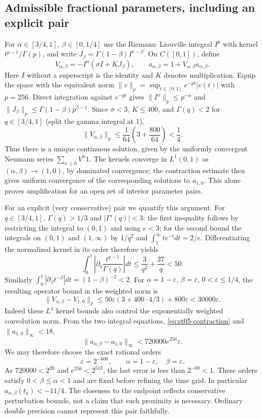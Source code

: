 \documentclass[11pt,a4paper]{amsart}
\theoremstyle{remark}
\theoremstyle{plain}
\theoremstyle{remark}
\numberwithin{equation}{section}
\begin{document}
\subsection{Admissible fractional parameters, including an explicit pair}
For $\alpha\in[3/4,1]$, $\beta\in[0,1/4]$ use the Riemann--Liouville integral $I^p$ with kernel $t^{p-1}/\Gamma(p)$, and write $J_\beta=\Gamma(1-\beta)I^{1-\beta}$. On $C([0,1])$, define
\[
 V_{\alpha,\beta}=-I^\alpha(\sigma I+K J_\beta),\qquad
 a_{\alpha,\beta}=1+V_{\alpha,\beta}a_{\alpha,\beta}.
\]
Here $I$ without a superscript is the identity and $K$ denotes multiplication. Equip the space with the equivalent norm $\|v\|_p=\sup_{t\in[0,1]}e^{-pt}|v(t)|$ with $p=256$. Direct integration against $e^{-pt}$ gives $\|I^\alpha\|_p\le p^{-\alpha}$ and $\|J_\beta\|_p\le\Gamma(1-\beta)p^{\beta-1}$. Since $\sigma<3$, $K\le400$, and $\Gamma(q)<2$ for $q\in[3/4,1]$ (split the gamma integral at 1),
\begin{equation}\label{eq:st05-contraction}
 \|V_{\alpha,\beta}\|_p\le\frac1{64}\left(3+\frac{800}{64}\right)<\frac14.
\end{equation}
Thus there is a unique continuous solution, given by the uniformly convergent Neumann series $\sum_{n\ge0}V^n1$. The kernels converge in $L^1(0,1)$ as $(\alpha,\beta)\to(1,0)$, by dominated convergence; the contraction estimate then gives uniform convergence of the corresponding solutions to $a_{1,0}$. This alone proves amplification for an open set of interior parameter pairs.

For an explicit (very conservative) pair we quantify this argument. For $q\in[3/4,1]$, $\Gamma(q)>1/3$ and $|\Gamma'(q)|<3$: the first inequality follows by restricting the integral to $(0,1)$ and using $e<3$; for the second bound the integrals on $(0,1)$ and $(1,\infty)$ by $1/q^2$ and $\int_1^\infty t e^{-t}dt=2/e$. Differentiating the normalized kernel in its order therefore yields
\[
 \int_0^1\left|\partial_q\frac{t^{q-1}}{\Gamma(q)}\right|dt
 \le \frac{3}{q^2}+\frac{27}{q}<50.
\]
Similarly $\int_0^1|\partial_\beta t^{-\beta}|dt=(1-\beta)^{-2}<2$. For $\alpha=1-\varepsilon$, $\beta=\varepsilon$, $0<\varepsilon\le1/4$, the resulting operator bound in the weighted norm is
\[
 \|V_{\alpha,\beta}-V_{1,0}\|_p
 \le 50\varepsilon(3+400\cdot4/3)+800\varepsilon<30000\varepsilon.
\]
Indeed these $L^1$ kernel bounds also control the exponentially weighted convolution norm. From the two integral equations, \eqref{eq:st05-contraction} and $\|a_{1,0}\|_\infty<18$,
\[
 \|a_{\alpha,\beta}-a_{1,0}\|_\infty<720000 e^{256}\varepsilon.
\]
We may therefore choose the exact rational orders
\begin{equation}\label{eq:st05-orders}
 \boxed{\varepsilon=2^{-600},\qquad \alpha=1-\varepsilon,\quad\beta=\varepsilon.}
\end{equation}
As $720000<2^{20}$ and $e^{256}<2^{512}$, the last error is less than $2^{-68}<1$. These orders satisfy $0<\beta\le\alpha<1$ and are fixed before refining the time grid. In particular $a_{\alpha,\beta}(t_a)<-11/4$. The closeness to the endpoint reflects conservative perturbation bounds, not a claim that such proximity is necessary. Ordinary double precision cannot represent this pair faithfully.
\end{document}
